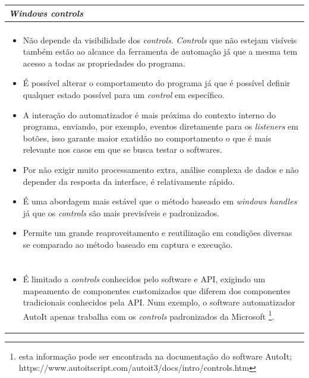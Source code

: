 \documentclass[tg]{mdtufsm}
\begin{document}
{                \begin{tabularx}{\textwidth}{|*{1}{>{\centering\arraybackslash}X}|}
                    \hline
                    \emph{Windows controls} \\
                    \hline
                    {\bf prós:} \\
                    \begin{itemize}
                        \item Não depende da visibilidade dos \emph{controls}. \emph{Controls} que não estejam visíveis também estão ao alcance da ferramenta de automação já que a mesma tem acesso a todas as propriedades do programa.
                        \item É possível alterar o comportamento do programa já que é possível definir qualquer estado possível para um \emph{control} em específico.
                        \item A interação do automatizador é mais próxima do contexto interno do programa, enviando, por exemplo, eventos diretamente para os \emph{listeners} em botões, isso garante maior exatidão no comportamento o que é mais relevante nos casos em que se busca testar o softwares.
                        \item Por não exigir muito processamento extra, análise complexa de dados e não depender da resposta da interface, é relativamente rápido.
                        \item É uma abordagem mais estável que o método baseado em \emph{windows handles} já que os \emph{controls} são mais previsíveis e padronizados.
                        \item Permite um grande reaproveitamento e reutilização em condições diversas se comparado ao método baseado em captura e execução.
                    \end{itemize}
                    \\ {\bf contras:} \\
                    \begin{itemize}
                        \item É limitado a \emph{controls} conhecidos pelo software e API, exigindo um mapeamento de componentes customizados que diferem dos componentes tradicionais conhecidos pela API. Num exemplo, o software automatizador AutoIt apenas trabalha com os \emph{controls} padronizados da Microsoft \footnote{esta informação pode ser encontrada na documentação do software AutoIt; https://www.autoitscript.com/autoit3/docs/intro/controls.htm}.

\end{itemize}
\end{tabularx}}
\end{document}
